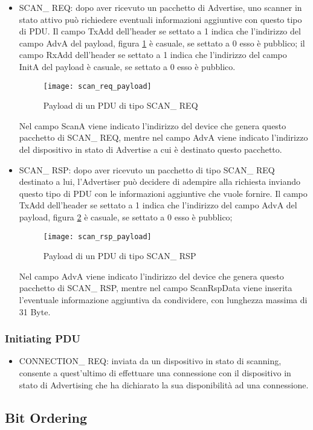 \begin{itemize}

\item SCAN\_ REQ: dopo aver ricevuto un pacchetto di Advertise, uno scanner in stato attivo può richiedere eventuali informazioni aggiuntive con questo tipo di PDU. Il campo TxAdd dell'header se settato a 1 indica che l'indirizzo del campo AdvA del payload, figura \ref{scan_req_payload} è casuale, se settato a 0 esso è pubblico; il campo RxAdd dell'header se settato a 1 indica che l'indirizzo del campo InitA del payload è casuale, se settato a 0 esso è pubblico.

\begin{figure}[H]
\texttt{[image: scan\_req\_payload]}
\centering
\caption{Payload di un PDU di tipo SCAN\_ REQ }
\label{scan_req_payload}
\end{figure}

Nel campo ScanA viene indicato l'indirizzo del device che genera questo pacchetto di SCAN\_ REQ, mentre nel campo AdvA viene indicato l'indirizzo del dispositivo in stato di Advertise a cui è destinato questo pacchetto.

\item SCAN\_ RSP: dopo aver ricevuto un pacchetto di tipo SCAN\_ REQ destinato a lui, l'Advertiser può decidere di adempire alla richiesta inviando questo tipo di PDU con le informazioni aggiuntive che vuole fornire. Il campo TxAdd dell'header se settato a 1 indica che l'indirizzo del campo AdvA del payload, figura \ref{scan_rsp_payload} è casuale, se settato a 0 esso è pubblico;

\begin{figure}[H]
\texttt{[image: scan\_rsp\_payload]}
\centering
\caption{Payload di un PDU di tipo SCAN\_ RSP }
\label{scan_rsp_payload}
\end{figure}

Nel campo AdvA viene indicato l'indirizzo del device che genera questo pacchetto di SCAN\_ RSP, mentre nel campo ScanRspData viene inserita l'eventuale informazione aggiuntiva da condividere, con lunghezza massima di 31 Byte.

\end{itemize}

\subsubsection{Initiating PDU}

\begin{itemize}
\item CONNECTION\_ REQ: inviata da un dispositivo in stato di scanning, consente a quest'ultimo di effettuare una connessione con il dispositivo in stato di Advertising che ha dichiarato la sua disponibilità ad una connessione.



\end{itemize}


\subsection{Bit Ordering}




